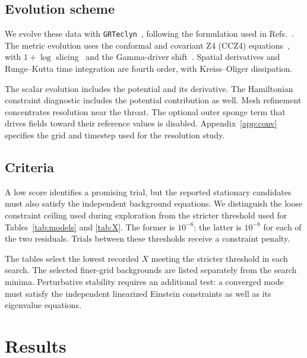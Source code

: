 \documentclass[twocolumn,floatfix,aps,prd,superscriptaddress,nofootinbib]{revtex4-2}
\begin{document}
\subsection{Evolution scheme}
\label{sec:setup:scheme}

We evolve these data with \texttt{GRTeclyn}~\cite{grteclyn,amrex,grchombo}, following the formulation used in Refs.~\cite{shirokov2026,shirokov2026s}. The metric evolution uses the conformal and covariant Z4 (CCZ4) equations~\cite{alic2012}, with $1{+}\log$ slicing~\cite{bona1995} and the Gamma-driver shift~\cite{alcubierre2003gauge}. Spatial derivatives and Runge--Kutta time integration are fourth order, with Kreiss--Oliger dissipation.

The scalar evolution includes the potential and its derivative. The Hamiltonian constraint diagnostic includes the potential contribution as well. Mesh refinement concentrates resolution near the throat. The optional outer sponge term that drives fields toward their reference values is disabled. Appendix~\ref{app:conv} specifies the grid and timestep used for the resolution study.

\subsection{Criteria}
\label{sec:setup:criteria}

A low score identifies a promising trial, but the reported stationary candidates must also satisfy the independent background equations. We distinguish the loose constraint ceiling used during exploration from the stricter threshold used for Tables~\ref{tab:models} and \ref{tab:X}. The former is $10^{-6}$; the latter is $10^{-8}$ for each of the two residuals. Trials between these thresholds receive a constraint penalty.

The tables select the lowest recorded $X$ meeting the stricter threshold in each search. The selected finer-grid backgrounds are listed separately from the search minima. Perturbative stability requires an additional test: a converged mode must satisfy the independent linearized Einstein constraints as well as its eigenvalue equations.

\section{Results}
\label{sec:results}
\end{document}
